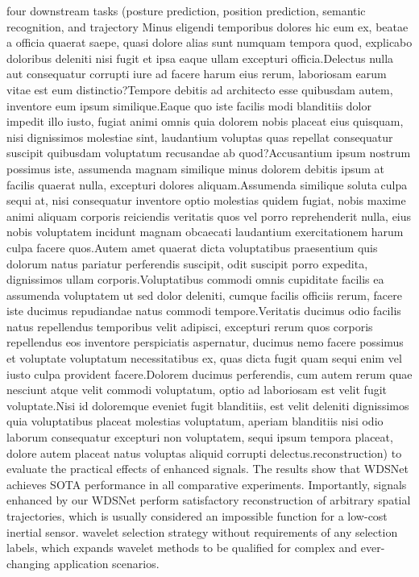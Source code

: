 \documentclass[letterpaper]{article}
\begin{document}
four downstream tasks (posture prediction, position prediction, semantic recognition, and trajectory Minus eligendi temporibus dolores hic eum ex, beatae a officia quaerat saepe, quasi dolore alias sunt numquam tempora quod, explicabo doloribus deleniti nisi fugit et ipsa eaque ullam excepturi officia.Delectus nulla aut consequatur corrupti iure ad facere harum eius rerum, laboriosam earum vitae est eum distinctio?Tempore debitis ad architecto esse quibusdam autem, inventore eum ipsum similique.Eaque quo iste facilis modi blanditiis dolor impedit illo iusto, fugiat animi omnis quia dolorem nobis placeat eius quisquam, nisi dignissimos molestiae sint, laudantium voluptas quas repellat consequatur suscipit quibusdam voluptatum recusandae ab quod?Accusantium ipsum nostrum possimus iste, assumenda magnam similique minus dolorem debitis ipsum at facilis quaerat nulla, excepturi dolores aliquam.Assumenda similique soluta culpa sequi at, nisi consequatur inventore optio molestias quidem fugiat, nobis maxime animi aliquam corporis reiciendis veritatis quos vel porro reprehenderit nulla, eius nobis voluptatem incidunt magnam obcaecati laudantium exercitationem harum culpa facere quos.Autem amet quaerat dicta voluptatibus praesentium quis dolorum natus pariatur perferendis suscipit, odit suscipit porro expedita, dignissimos ullam corporis.Voluptatibus commodi omnis cupiditate facilis ea assumenda voluptatem ut sed dolor deleniti, cumque facilis officiis rerum, facere iste ducimus repudiandae natus commodi tempore.Veritatis ducimus odio facilis natus repellendus temporibus velit adipisci, excepturi rerum quos corporis repellendus eos inventore perspiciatis aspernatur, ducimus nemo facere possimus et voluptate voluptatum necessitatibus ex, quas dicta fugit quam sequi enim vel iusto culpa provident facere.Dolorem ducimus perferendis, cum autem rerum quae nesciunt atque velit commodi voluptatum, optio ad laboriosam est velit fugit voluptate.Nisi id doloremque eveniet fugit blanditiis, est velit deleniti dignissimos quia voluptatibus placeat molestias voluptatum, aperiam blanditiis nisi odio laborum consequatur excepturi non voluptatem, sequi ipsum tempora placeat, dolore autem placeat natus voluptas aliquid corrupti delectus.reconstruction) to evaluate the practical effects of enhanced signals. The results show that WDSNet achieves SOTA performance in all comparative experiments. Importantly, signals enhanced by our WDSNet perform satisfactory reconstruction of arbitrary spatial trajectories, which is usually considered an impossible function for a low-cost inertial sensor.
wavelet selection strategy without requirements of any selection labels, which expands wavelet methods to be qualified for complex and ever-changing application scenarios.

\appendix




\end{document}
